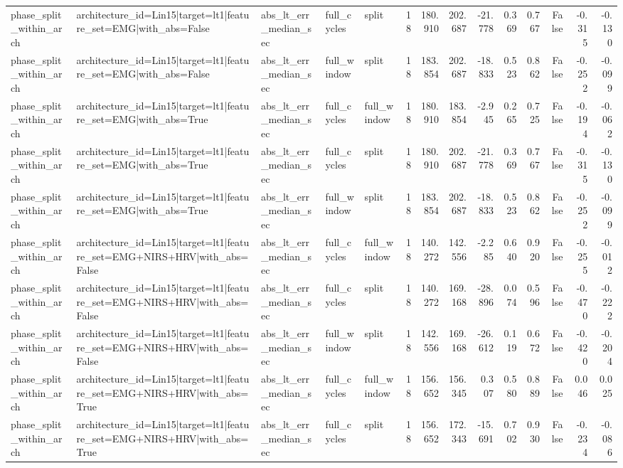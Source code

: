 \begin{table}
\begin{tabular}{lllllrrrrrrrrr}
phase_split_within_arch & architecture_id=Lin15|target=lt1|feature_set=EMG|with_abs=False & abs_lt_err_median_sec & full_cycles & split & 18 & 180.910 & 202.687 & -21.778 & 0.369 & 0.767 & False & -0.315 & -0.130 \\
phase_split_within_arch & architecture_id=Lin15|target=lt1|feature_set=EMG|with_abs=False & abs_lt_err_median_sec & full_window & split & 18 & 183.854 & 202.687 & -18.833 & 0.523 & 0.862 & False & -0.252 & -0.099 \\
phase_split_within_arch & architecture_id=Lin15|target=lt1|feature_set=EMG|with_abs=True & abs_lt_err_median_sec & full_cycles & full_window & 18 & 180.910 & 183.854 & -2.945 & 0.265 & 0.725 & False & -0.194 & -0.062 \\
phase_split_within_arch & architecture_id=Lin15|target=lt1|feature_set=EMG|with_abs=True & abs_lt_err_median_sec & full_cycles & split & 18 & 180.910 & 202.687 & -21.778 & 0.369 & 0.767 & False & -0.315 & -0.130 \\
phase_split_within_arch & architecture_id=Lin15|target=lt1|feature_set=EMG|with_abs=True & abs_lt_err_median_sec & full_window & split & 18 & 183.854 & 202.687 & -18.833 & 0.523 & 0.862 & False & -0.252 & -0.099 \\
phase_split_within_arch & architecture_id=Lin15|target=lt1|feature_set=EMG+NIRS+HRV|with_abs=False & abs_lt_err_median_sec & full_cycles & full_window & 18 & 140.272 & 142.556 & -2.285 & 0.640 & 0.920 & False & -0.255 & -0.012 \\
phase_split_within_arch & architecture_id=Lin15|target=lt1|feature_set=EMG+NIRS+HRV|with_abs=False & abs_lt_err_median_sec & full_cycles & split & 18 & 140.272 & 169.168 & -28.896 & 0.074 & 0.596 & False & -0.470 & -0.222 \\
phase_split_within_arch & architecture_id=Lin15|target=lt1|feature_set=EMG+NIRS+HRV|with_abs=False & abs_lt_err_median_sec & full_window & split & 18 & 142.556 & 169.168 & -26.612 & 0.119 & 0.672 & False & -0.420 & -0.204 \\
phase_split_within_arch & architecture_id=Lin15|target=lt1|feature_set=EMG+NIRS+HRV|with_abs=True & abs_lt_err_median_sec & full_cycles & full_window & 18 & 156.652 & 156.345 & 0.307 & 0.580 & 0.889 & False & 0.046 & 0.025 \\
phase_split_within_arch & architecture_id=Lin15|target=lt1|feature_set=EMG+NIRS+HRV|with_abs=True & abs_lt_err_median_sec & full_cycles & split & 18 & 156.652 & 172.343 & -15.691 & 0.702 & 0.930 & False & -0.234 & -0.086 \\

\end{tabular}
\end{table}
